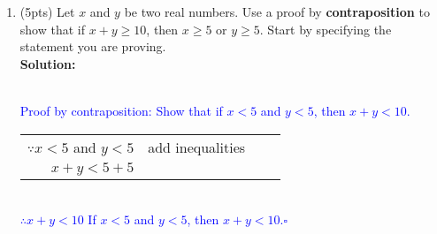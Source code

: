 \documentclass{article}
\newcommand{\sol}[1]{\textbf{Solution:\,}\textcolor{blue}{#1}}
\begin{document}
\begin{enumerate}
\newpage

\item(5pts) Let $x$ and $y$ be two real numbers. Use a proof by \textbf{contraposition} to show that if $x + y \geq 10$, then $x \geq 5$ or $y \geq 5$. Start by specifying the statement you are proving.
\\\sol{
\\Proof by contraposition: Show that if $x<5$ and $y<5$, then $x+y<10$.
\\\begin{tabular}{rlll}
$\because x<5$ and $y<5$&add inequalities\\
$x+y<5+5$\\
\end{tabular}\\
$\therefore x+y<10$ \quad\quad\quad\quad If $x<5$ and $y<5$, then $x+y<10$.\hfill$\square$
}

\newpage


\end{enumerate}
\end{document}
